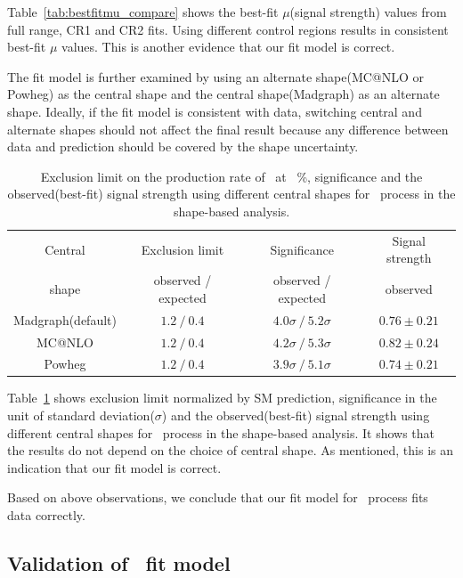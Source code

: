 Table~\ref{tab:bestfitmu_compare} shows the best-fit $\mu$(signal strength) 
values from full range, CR1 and CR2 fits. 
Using different control regions results in consistent best-fit $\mu$ values. 
This is another evidence that our fit model is correct. 

The fit model is further examined by using an alternate shape(MC@NLO or Powheg) 
as the central shape and the central shape(Madgraph) as an alternate shape.   
Ideally, if the fit model is consistent with data, switching central and 
alternate shapes should not affect the final result because any difference 
between data and prediction should be covered by the shape uncertainty. 
%
\begin{table}[htp] 
\begin{center} 
\small
\vspace{0.5cm}
\caption{Exclusion limit on the production rate of \hww\ at ~\%, 
significance and the observed(best-fit) signal strength using different 
central shapes for \qqww\ process in the shape-based analysis. } 
\vspace{0.5cm}
\begin{tabular}{c|ccc} 
\hline 
Central & Exclusion limit & Significance & Signal strength  \\ 
shape & observed / expected  & observed / expected & observed \\ 
\hline 
\hline 
Madgraph(default) & $1.2~/~0.4$ & $4.0\sigma~/~5.2\sigma$ & $0.76\pm0.21$ \\
MC@NLO            & $1.2~/~0.4$ & $4.2\sigma~/~5.3\sigma$ & $0.82\pm0.24$ \\
Powheg            & $1.2~/~0.4$ & $3.9\sigma~/~5.1\sigma$ & $0.74\pm0.21$ \\
\hline 
\end{tabular} 
\label{tab:diffqqwwshape} 
\end{center} 
\end{table} 
%
Table~\ref{tab:diffqqwwshape} shows exclusion limit normalized by SM prediction, 
significance in the unit of standard deviation($\sigma$) 
and the observed(best-fit) signal strength using different 
central shapes for \qqww\ process in the shape-based analysis.
It shows that the results do not depend on the choice of central shape.   
As mentioned, this is an indication that our fit model is correct. 

Based on above observations, we conclude that our fit model for \qqww\ process fits data correctly.  

\subsection{Validation of \topbkg\ fit model} 


